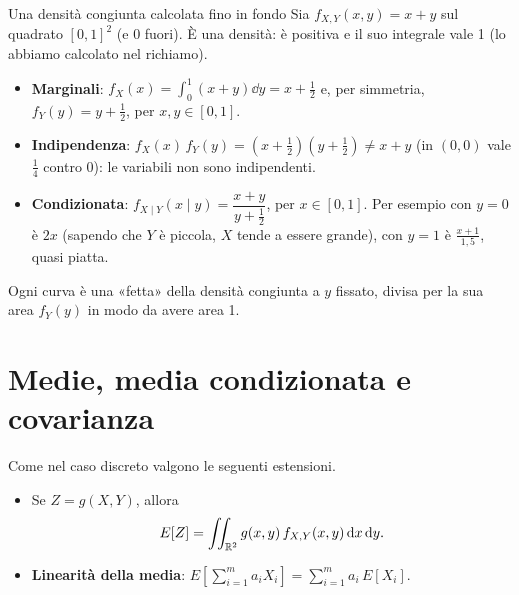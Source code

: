 \begin{esempio}{Una densità congiunta calcolata fino in fondo}
Sia $f_{X,Y}(x, y) = x + y$ sul quadrato $[0, 1]^2$ (e 0 fuori). È una densità: è positiva e il suo integrale vale 1
(lo abbiamo calcolato nel richiamo).
\begin{itemize}
  \item \textbf{Marginali}: $f_X(x) = \int_0^1 (x + y) \dd y = x + \frac12$ e, per simmetria, $f_Y(y) = y + \frac12$,
        per $x, y \in [0, 1]$.
  \item \textbf{Indipendenza}: $f_X(x)\, f_Y(y) = \left(x + \frac12\right)\left(y + \frac12\right) \neq x + y$ (in
        $(0, 0)$ vale $\frac14$ contro 0): le variabili non sono indipendenti.
  \item \textbf{Condizionata}: $f_{X \mid Y}(x \mid y) = \dfrac{x + y}{y + \frac12}$, per $x \in [0, 1]$. Per esempio
        con $y = 0$ è $2x$ (sapendo che $Y$ è piccola, $X$ tende a essere grande), con $y = 1$ è $\frac{x + 1}{1{,}5}$,
        quasi piatta.
\end{itemize}
\begin{center}
\end{center}
Ogni curva è una «fetta» della densità congiunta a $y$ fissato, divisa per la sua area $f_Y(y)$ in modo da avere area 1.
\end{esempio}

\section{Medie, media condizionata e covarianza}

Come nel caso discreto valgono le seguenti estensioni.
\begin{itemize}
  \item Se $Z = g(X, Y)$, allora
        \[ E[Z] = \iint_{\mathbb{R}^2} g(x, y)\, f_{X,Y}(x, y) \,\mathrm{d} x \,\mathrm{d} y . \]
  \item \textbf{Linearità della media}: $E\left[ \sum_{i=1}^{m} a_i X_i \right] = \sum_{i=1}^{m} a_i\, E[X_i]$.
\end{itemize}

